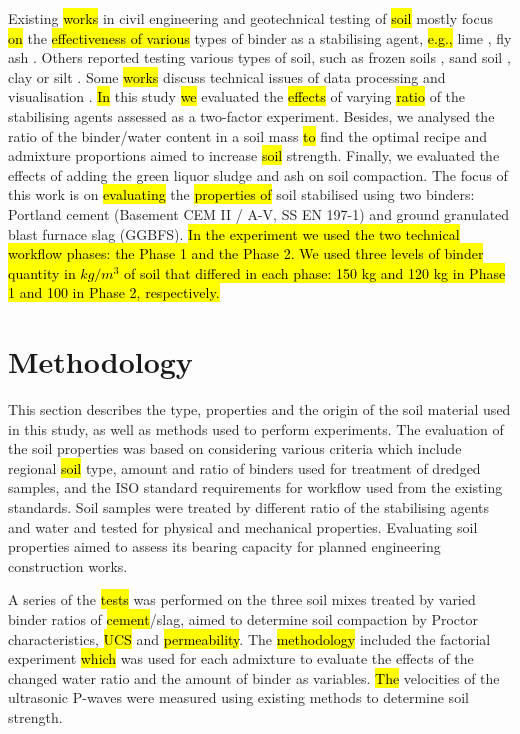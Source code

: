\documentclass{amestyle}
\begin{document}
Existing \hl{works} in civil engineering and geotechnical testing of \hl{soil} mostly focus \hl{on} the \hl{effectiveness of various} types of binder as a stabilising agent, \hl{e.g.,} lime \cite{Rao,Mukhtar,Swaidani}, fly ash \cite{Phetchuay}. Others reported testing various types of soil, such as frozen soils \cite{Lemenkov2021b,Lemenkov2021c}, sand soil \cite{Robertson}, clay or silt \cite{Komal}. Some \hl{works} discuss technical issues of data processing and visualisation \cite{Kaellenetal2014,Lemenkov2021c}. \hl{In} this study \hl{we} evaluated the \hl{effects} of varying \hl{ratio} of the stabilising agents assessed as a two-factor experiment. Besides, we analysed the ratio of the binder/water content in a soil mass \hl{to} find the optimal recipe and admixture proportions aimed to increase \hl{soil} strength. Finally, we evaluated the effects of adding the green liquor sludge and ash on soil compaction. The focus of this work is on \hl{evaluating} the \hl{properties of} soil stabilised using two binders: Portland cement (Basement CEM II / A-V, SS EN 197-1) and ground granulated blast furnace slag (GGBFS). \hl{In the experiment we used the two technical workflow phases: the Phase 1 and the Phase 2. We used three levels of binder quantity in $kg/m^3$ of soil that differed in each phase: 150 kg and 120 kg in Phase 1 and 100 in Phase 2, respectively.}


\section{Methodology}
This section describes the type, properties and the origin of the soil material used in this study, as well as methods used to perform experiments. The evaluation of the soil properties was based on considering various criteria which include regional \hl{soil }type, amount and ratio of binders used for treatment of dredged samples, and the ISO standard requirements for workflow used from the existing standards. Soil samples were treated by different ratio of the stabilising agents and water and tested for physical and mechanical properties. Evaluating soil properties aimed to assess its bearing capacity for planned engineering construction works.

A series of the \hl{tests} was performed on the three soil mixes treated by varied binder ratios of \hl{cement}/slag, aimed to determine soil compaction by Proctor characteristics, \hl{UCS} and \hl{permeability}. The \hl{methodology} included the factorial experiment \hl{which} was used for each admixture to evaluate the effects of the changed water ratio and the amount of binder as variables. \hl{The} velocities of the ultrasonic P-waves were measured using existing\hl{ }methods \cite{Lindh202102} to determine soil strength. 
\end{document}
